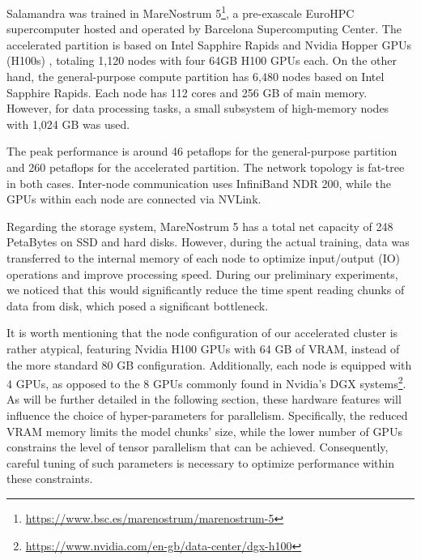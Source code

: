 
Salamandra was trained in MareNostrum 5\footnote{\url{https://www.bsc.es/marenostrum/marenostrum-5}}, a pre-exascale EuroHPC supercomputer hosted and operated by Barcelona Supercomputing Center. The accelerated partition is based on Intel Sapphire Rapids and Nvidia Hopper GPUs (H100s) \cite{h100}, totaling 1,120 nodes with four 64GB H100 GPUs each. On the other hand, the general-purpose compute partition has 6,480 nodes based on Intel Sapphire Rapids. Each node has 112 cores and 256 GB of main memory. However, for data processing tasks, a small subsystem of high-memory nodes with 1,024 GB was used.

The peak performance is around 46 petaflops for the general-purpose partition and 260 petaflops for the accelerated partition. The network topology is fat-tree in both cases. Inter-node communication uses InfiniBand NDR 200, while the GPUs within each node are connected via NVLink. 

Regarding the storage system, MareNostrum 5 has a total net capacity of 248 PetaBytes on SSD and hard disks. However, during the actual training, data was transferred to the internal memory of each node to optimize input/output (IO) operations and improve processing speed. During our preliminary experiments, we noticed that this would significantly reduce the time spent reading chunks of data from disk, which posed a significant bottleneck.

It is worth mentioning that the node configuration of our accelerated cluster is rather atypical, featuring Nvidia H100 GPUs with 64 GB of VRAM, instead of the more standard 80 GB configuration. Additionally, each node is equipped with 4 GPUs, as opposed to the 8 GPUs commonly found in Nvidia's DGX systems\footnote{\url{https://www.nvidia.com/en-gb/data-center/dgx-h100}}. As will be further detailed in the following section, these hardware features will influence the choice of hyper-parameters for parallelism. Specifically, the reduced VRAM memory limits the model chunks' size, while the lower number of GPUs constrains the level of tensor parallelism that can be achieved.  Consequently, careful tuning of such parameters is necessary to optimize performance within these constraints. 
